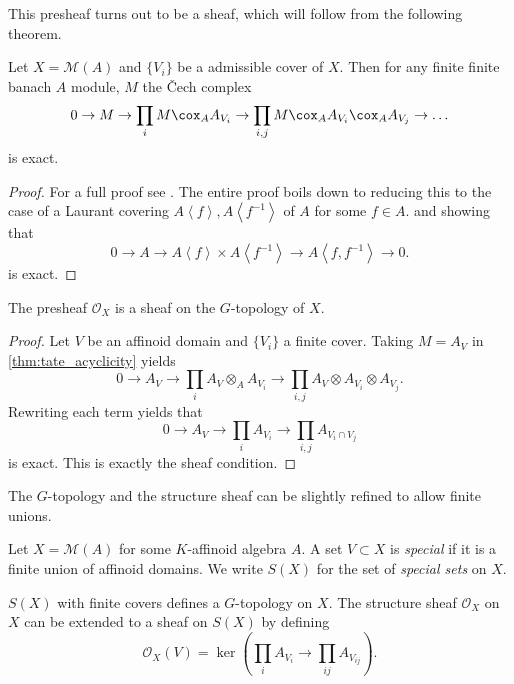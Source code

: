 This presheaf turns out to be a sheaf, which will follow from the following theorem. 
\begin{theorem}\label{thm:tate_acyclicity}
	Let $X = \mathcal{M} (A)$ and $\{V_i\} $ be a admissible cover of $X$. 
	Then for any finite finite banach $A$ module, $M$ the Čech complex \[
		0 \to M \to \prod_{i} M \cox_A A_{V_i} \to \prod_{i, j} M \cox_A A_{V_i} \cox_A A_{V_j} \to \ldots
	\] 
	is exact. 
\end{theorem}
\begin{proof}
	For a full proof see \cite[][prop.\ 2.2.5]{berkovichSpectralTheoryAnalytic2012}. 
	The entire proof boils down to reducing this to the case of a Laurant covering $A\left<f \right>, A\left<f^{-1} \right>$ of $A$ for some $f \in A$. and showing that \[
		0 \to A \to A\left<f \right>\times  A\left<f^{-1} \right> \to A\left<f, f^{-1} \right> \to 0
	.\]  
	is exact. 
\end{proof}


\begin{corollary}
	The presheaf $\mathcal{O}_X$ is a sheaf on the $G$-topology of $X$.
\end{corollary}
\begin{proof}
	Let $V$ be an affinoid domain and $\{V_i\} $ a finite cover. 
	Taking $M = A_V$ in \cref{thm:tate_acyclicity} yields \[
	0 \to A_V \to \prod_{i } A_V \otimes_A A_{V_i} \to \prod_{i,j} A_V \otimes A_{V_i} \otimes A_{V_j}
	.\] 
	Rewriting each term yields that \[
	0 \to A_V \to \prod_i A_{V_i} \to \prod_{i, j} A_{V_i \cap V_j}
	\] 
	is exact. This is exactly the sheaf condition. 
\end{proof}

The $G$-topology and the structure sheaf can be slightly refined to allow finite unions. 
\begin{definition}
	Let $X = \mathcal{M} (A)$ for some $K$-affinoid algebra $A$. 
	A set $V\subset  X$ is \emph{special} if it is a finite union of affinoid domains. 
	We write $S(X)$ for the set of \emph{special sets} on $X$. 
\end{definition}

\begin{definition}
	$S(X)$ with finite covers defines a $G$-topology on $X$. 
	The structure sheaf  $\mathcal{O}_X$ on $X$ can be extended to a sheaf on $S(X)$ by defining \[
		\mathcal{O}_X(V) = \ker\left(\prod_i A_{V_i} \to \prod_{ij} A_{V_{ij}}\right)
	.\] 
\end{definition}


